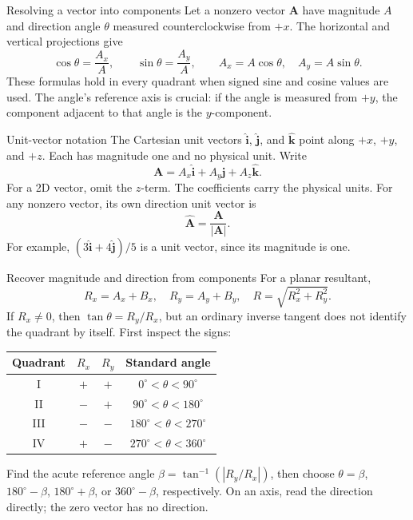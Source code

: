 \documentclass[11pt,letterpaper]{article}
\newcommand{\vect}[1]{\boldsymbol{#1}}
\newcommand{\uv}[1]{\hat{\boldsymbol{#1}}}
\newcommand{\degree}{^{\circ}}
\begin{document}
\begin{derivbox}{Resolving a vector into components}
Let a nonzero vector $\vect A$ have magnitude $A$ and direction angle $\theta$ measured counterclockwise from $+x$. The horizontal and vertical projections give
\[
 \cos\theta=\frac{A_x}{A},\qquad \sin\theta=\frac{A_y}{A},
 \qquad\boxed{A_x=A\cos\theta,\quad A_y=A\sin\theta.}
\]
These formulas hold in every quadrant when signed sine and cosine values are used. The angle's reference axis is crucial: if the angle is measured from $+y$, the component adjacent to that angle is the $y$-component.
\end{derivbox}

\begin{defbox}{Unit-vector notation}
The Cartesian unit vectors $\uv i$, $\uv j$, and $\uv k$ point along $+x$, $+y$, and $+z$. Each has magnitude one and no physical unit. Write
\[
 \boxed{\vect A=A_x\uv i+A_y\uv j+A_z\uv k.}
\]
For a 2D vector, omit the $z$-term. The coefficients carry the physical units. For any nonzero vector, its own direction unit vector is
\[
 \uv A=\frac{\vect A}{|\vect A|}.
\]
For example, $(3\uv i+4\uv j)/5$ is a unit vector, since its magnitude is one.
\end{defbox}

\begin{rulebox}{Recover magnitude and direction from components}
For a planar resultant,
\[
 R_x=A_x+B_x,\quad R_y=A_y+B_y,\quad
 R=\sqrt{R_x^2+R_y^2}.
\]
If $R_x\ne0$, then $\tan\theta=R_y/R_x$, but an ordinary inverse tangent does not identify the quadrant by itself. First inspect the signs:
\begin{center}
\begin{tabular}{cccc}
\toprule
Quadrant & $R_x$ & $R_y$ & Standard angle\\
\midrule
I & $+$ & $+$ & $0\degree<\theta<90\degree$\\
II & $-$ & $+$ & $90\degree<\theta<180\degree$\\
III & $-$ & $-$ & $180\degree<\theta<270\degree$\\
IV & $+$ & $-$ & $270\degree<\theta<360\degree$\\
\bottomrule
\end{tabular}
\end{center}
Find the acute reference angle $\beta=\tan^{-1}(|R_y/R_x|)$, then choose $\theta=\beta$, $180\degree-\beta$, $180\degree+\beta$, or $360\degree-\beta$, respectively. On an axis, read the direction directly; the zero vector has no direction.
\end{rulebox}
\end{document}
